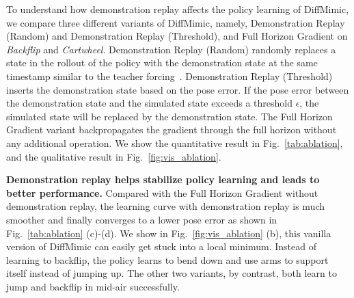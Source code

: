 To understand how demonstration replay affects the policy learning of DiffMimic, we compare three different variants of DiffMimic, namely, Demonstration Replay (Random) and Demonstration Replay (Threshold), and Full Horizon Gradient on \textit{Backflip} and \textit{Cartwheel}. Demonstration Replay (Random) randomly replaces a state in the rollout of the policy with the demonstration state at the same timestamp similar to the teacher forcing~\citep{williams1989learning}. Demonstration Replay (Threshold) inserts the demonstration state based on the pose error. If the pose error between the demonstration state and the simulated state exceeds a threshold $\epsilon$, the simulated state will be replaced by the demonstration state.
The Full Horizon Gradient variant backpropagates the gradient through the full horizon without any additional operation. We show the quantitative result in Fig.~\ref{tab:ablation}, and the qualitative result in Fig.~\ref{fig:vis_ablation}. 

\textbf{Demonstration replay helps stabilize policy learning and leads to better performance.} Compared with the Full Horizon Gradient without demonstration replay, the learning curve with demonstration replay is much smoother and finally converges to a lower pose error as shown in Fig.~\ref{tab:ablation} (c)-(d). We show in Fig.~\ref{fig:vis_ablation} (b), this vanilla version of DiffMimic can easily get stuck into a local minimum. Instead of learning to backflip, the policy learns to bend down and use arms to support itself instead of jumping up. The other two variants, by contrast, both learn to jump and backflip in mid-air successfully. 

